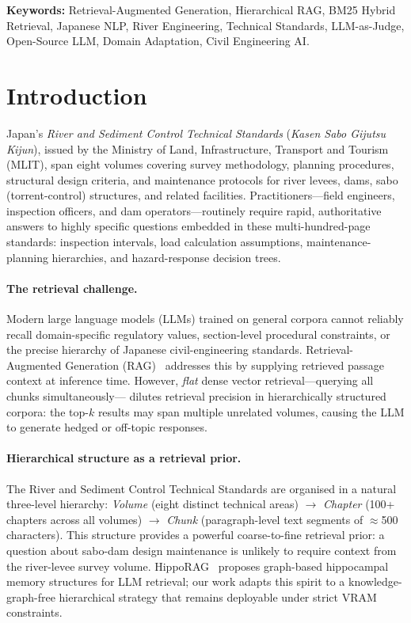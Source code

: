\documentclass[twocolumn]{article}
\begin{document}
\noindent
\textbf{Keywords:} Retrieval-Augmented Generation, Hierarchical RAG,
BM25 Hybrid Retrieval, Japanese NLP, River Engineering, Technical Standards,
LLM-as-Judge, Open-Source LLM, Domain Adaptation, Civil Engineering AI.

\section{Introduction}
\label{sec:intro}

Japan's \emph{River and Sediment Control Technical Standards}
(\textit{Kasen Sabo Gijutsu Kijun}), issued by the Ministry of Land, Infrastructure,
Transport and Tourism (MLIT), span eight volumes covering survey methodology,
planning procedures, structural design criteria, and maintenance protocols for
river levees, dams, sabo (torrent-control) structures, and related facilities.
Practitioners---field engineers, inspection officers, and dam operators---routinely
require rapid, authoritative answers to highly specific questions embedded in
these multi-hundred-page standards:
inspection intervals, load calculation assumptions, maintenance-planning hierarchies,
and hazard-response decision trees.

\paragraph{The retrieval challenge.}
Modern large language models (LLMs) trained on general corpora cannot reliably recall
domain-specific regulatory values, section-level procedural constraints, or the
precise hierarchy of Japanese civil-engineering standards.
Retrieval-Augmented Generation (RAG)~\cite{lewis2020rag} addresses this by supplying
retrieved passage context at inference time.
However, \emph{flat} dense vector retrieval---querying all chunks simultaneously---
dilutes retrieval precision in hierarchically structured corpora: the top-$k$ results
may span multiple unrelated volumes, causing the LLM to generate hedged or
off-topic responses.

\paragraph{Hierarchical structure as a retrieval prior.}
The River and Sediment Control Technical Standards are organised in a natural
three-level hierarchy:
\emph{Volume} (eight distinct technical areas)
$\to$ \emph{Chapter} (100+ chapters across all volumes)
$\to$ \emph{Chunk} (paragraph-level text segments of $\approx$500 characters).
This structure provides a powerful coarse-to-fine retrieval prior:
a question about sabo-dam design maintenance is unlikely to require context from
the river-levee survey volume.
HippoRAG~\cite{gutiontov2024hipporag2} proposes graph-based hippocampal memory
structures for LLM retrieval; our work adapts this spirit to a knowledge-graph-free
hierarchical strategy that remains deployable under strict VRAM constraints.
\end{document}
